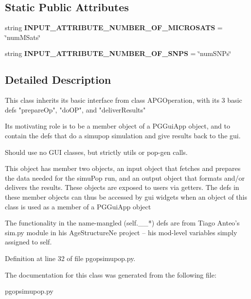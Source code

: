 \subsection*{Static Public Attributes}
\begin{DoxyCompactItemize}
\item 
string {\bfseries I\+N\+P\+U\+T\+\_\+\+A\+T\+T\+R\+I\+B\+U\+T\+E\+\_\+\+N\+U\+M\+B\+E\+R\+\_\+\+O\+F\+\_\+\+M\+I\+C\+R\+O\+S\+A\+TS} = \char`\"{}num\+M\+Sats\char`\"{}\hypertarget{classnegui_1_1pgopsimupop_1_1PGOpSimuPop_afad9fd5e836335f749ae96a958d3786e}{}\label{classnegui_1_1pgopsimupop_1_1PGOpSimuPop_afad9fd5e836335f749ae96a958d3786e}

\item 
string {\bfseries I\+N\+P\+U\+T\+\_\+\+A\+T\+T\+R\+I\+B\+U\+T\+E\+\_\+\+N\+U\+M\+B\+E\+R\+\_\+\+O\+F\+\_\+\+S\+N\+PS} = \char`\"{}num\+S\+N\+Ps\char`\"{}\hypertarget{classnegui_1_1pgopsimupop_1_1PGOpSimuPop_ac0c65641439fe744a0b62bd037145b3b}{}\label{classnegui_1_1pgopsimupop_1_1PGOpSimuPop_ac0c65641439fe744a0b62bd037145b3b}

\end{DoxyCompactItemize}


\subsection{Detailed Description}
\begin{DoxyVerb}This class inherits its basic interface from class APGOperation, with its 3
basic defs "prepareOp", "doOP", and "deliverResults"

Its motivating role is to be a member object of a PGGuiApp object, and to contain the
defs that do a simupop simulation and give results back to the gui.

Should use no GUI classes, but strictly utils or pop-gen calls.

This object has member two objects, an input object that fetches and prepares the
data needed for the simuPop run, and an output object that formats and/or delivers
the results.   These objects are exposed to users via getters.  The defs in these 
member objects can thus be accessed by gui widgets when an object of this class  
is used as a member of a PGGuiApp object

The functionality in the name-mangled (self.__*) defs are from Tiago Anteo's sim.py module in 
his AgeStructureNe project -- his mod-level variables simply assigned to self.
\end{DoxyVerb}
 

Definition at line 32 of file pgopsimupop.\+py.



The documentation for this class was generated from the following file\+:\begin{DoxyCompactItemize}
\item 
pgopsimupop.\+py\end{DoxyCompactItemize}
